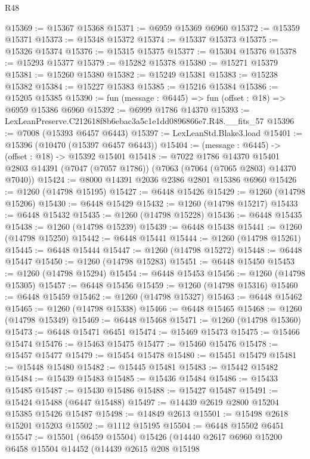 \begin{lexlean}{R48}
\begin{coremodule}
@15369 := @15367 @15368
@15371 := @6959 @15369 @6960
@15372 := @15359 @15371
@15373 := @15348 @15372
@15374 := @15337 @15373
@15375 := @15326 @15374
@15376 := @15315 @15375
@15377 := @15304 @15376
@15378 := @15293 @15377
@15379 := @15282 @15378
@15380 := @15271 @15379
@15381 := @15260 @15380
@15382 := @15249 @15381
@15383 := @15238 @15382
@15384 := @15227 @15383
@15385 := @15216 @15384
@15386 := @15205 @15385
@15390 := fun (message : @6445) => fun (offset : @18) => @6959 @15386 @6960
@15392 := @6999 @1786 @14370
@15393 := LexLeanPreserve.C212618f8b6ebac3a5c1e1dd0896866e7.R48.__fits_57
@15396 := @7008 (@15393 @6457 @6443)
@15397 := LexLeanStd.Blake3.load
@15401 := @15396 (@10470 (@15397 @6457 @6443))
@15404 := (message : @6445) -> (offset : @18) -> @15392 @15401
@15418 := @7022
    @1786
    @14370
    @15401
    @2803
    @14391
    (@7047 (@7057 @1786))
    (@7063 (@7064 (@7065 @2803) @14370 @7040))
@15424 := @8000 @14391 @2036 @2386 @2801 @15386 @6960
@15426 := @1260 (@14798 @15195)
@15427 := @6448 @15426
@15429 := @1260 (@14798 @15206)
@15430 := @6448 @15429
@15432 := @1260 (@14798 @15217)
@15433 := @6448 @15432
@15435 := @1260 (@14798 @15228)
@15436 := @6448 @15435
@15438 := @1260 (@14798 @15239)
@15439 := @6448 @15438
@15441 := @1260 (@14798 @15250)
@15442 := @6448 @15441
@15444 := @1260 (@14798 @15261)
@15445 := @6448 @15444
@15447 := @1260 (@14798 @15272)
@15448 := @6448 @15447
@15450 := @1260 (@14798 @15283)
@15451 := @6448 @15450
@15453 := @1260 (@14798 @15294)
@15454 := @6448 @15453
@15456 := @1260 (@14798 @15305)
@15457 := @6448 @15456
@15459 := @1260 (@14798 @15316)
@15460 := @6448 @15459
@15462 := @1260 (@14798 @15327)
@15463 := @6448 @15462
@15465 := @1260 (@14798 @15338)
@15466 := @6448 @15465
@15468 := @1260 (@14798 @15349)
@15469 := @6448 @15468
@15471 := @1260 (@14798 @15360)
@15473 := @6448 @15471 @6451
@15474 := @15469 @15473
@15475 := @15466 @15474
@15476 := @15463 @15475
@15477 := @15460 @15476
@15478 := @15457 @15477
@15479 := @15454 @15478
@15480 := @15451 @15479
@15481 := @15448 @15480
@15482 := @15445 @15481
@15483 := @15442 @15482
@15484 := @15439 @15483
@15485 := @15436 @15484
@15486 := @15433 @15485
@15487 := @15430 @15486
@15488 := @15427 @15487
@15491 := @15424 @15488 (@6447 @15488)
@15497 := @14439 @2619 @2800 @15204 @15385 @15426 @15487
@15498 := @14849 @2613
@15501 := @15498 @2618 @15201 @15203
@15502 := @1112 @15195
@15504 := @6448 @15502 @6451
@15547 := @15501
    (@6459 @15504)
    @15426
    (@14440
      @2617
      @6960
      @15200
      @6458
      @15504
      @14452
      (@14439
        @2615
        @208
        @15198

\end{coremodule}
\end{lexlean}
